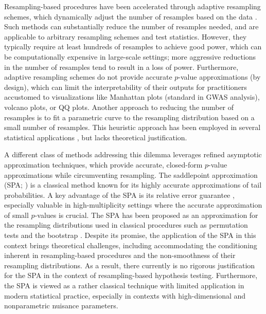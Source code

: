 \documentclass[12pt]{article}
\theoremstyle{definition}
\begin{document}
Resampling-based procedures have been accelerated through adaptive resampling schemes, which dynamically adjust the number of resamples based on the data \citep{Besag1991,Gandy2009,Gandy2014,Gandy2016,Gandy2017a,Fischer2024a,Fischer2024}. Such methods can substantially reduce the number of resamples needed, and are applicable to arbitrary resampling schemes and test statistics. However, they typically require at least hundreds of resamples to achieve good power, which can be computationally expensive in large-scale settings; more aggressive reductions in the number of resamples tend to result in a loss of power. Furthermore, adaptive resampling schemes do not provide accurate $p$-value approximations (by design), which can limit the interpretability of their outputs for practitioners accustomed to visualizations like Manhattan plots (standard in GWAS analysis), volcano plots, or QQ plots. Another approach to reducing the number of resamples is to fit a parametric curve to the resampling distribution based on a small number of resamples. This heuristic approach has been employed in several statistical applications \citep{Ge2012,Winkler2016,Katsevich2020c}, but lacks theoretical justification.

A different class of methods addressing this dilemma leverages refined asymptotic approximation techniques, which provide accurate, closed-form $p$-value approximations while circumventing resampling. The saddlepoint approximation (SPA; \citealp{Daniels1954,Lugannani1980}) is a classical method known for its highly accurate approximations of tail probabilities. A key advantage of the SPA is its relative error guarantee \citep{Kolassa2006,Butler2007}, especially valuable in high-multiplicity settings where the accurate approximation of small $p$-values is crucial. The SPA has been proposed as an approximation for the resampling distributions used in classical procedures such as permutation tests \citep{Robinson1982} and the bootstrap \citep{Hinkley1988}. Despite its promise, the application of the SPA in this context brings theoretical challenges, including accommodating the conditioning inherent in resampling-based procedures and the non-smoothness of their resampling distributions. As a result, there currently is no rigorous justification for the SPA in the context of resampling-based hypothesis testing. Furthermore, the SPA is viewed as a rather classical technique with limited application in modern statistical practice, especially in contexts with high-dimensional and nonparametric nuisance parameters.
  
\end{document}
